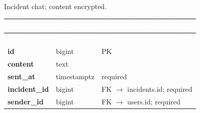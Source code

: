 \subsection*{}
Incident chat; content encrypted.\par\vspace{2pt}
{\tabfont\rowband
\begin{longtable}{@{}>{\raggedright\arraybackslash}p{}>{\raggedright\arraybackslash}p{}>{\raggedright\arraybackslash}p{}@{}}
\rowcolor{najdanavy}\textcolor{white}{\sffamily\bfseries\small Column} & \textcolor{white}{\sffamily\bfseries\small Type} & \textcolor{white}{\sffamily\bfseries\small Constraints and notes}\\
\endfirsthead
\rowcolor{najdanavy}\textcolor{white}{\sffamily\bfseries\small Column} & \textcolor{white}{\sffamily\bfseries\small Type} & \textcolor{white}{\sffamily\bfseries\small Constraints and notes}\\
\endhead
\bottomrule\endlastfoot
\textbf{id} & bigint & PK\\
\textbf{content} & text & \\
\textbf{sent\_\allowbreak{}at} & timestamptz & required\\
\textbf{incident\_\allowbreak{}id} & bigint & FK $\rightarrow$ incidents.id; required\\
\textbf{sender\_\allowbreak{}id} & bigint & FK $\rightarrow$ users.id; required\\
\end{longtable}}

